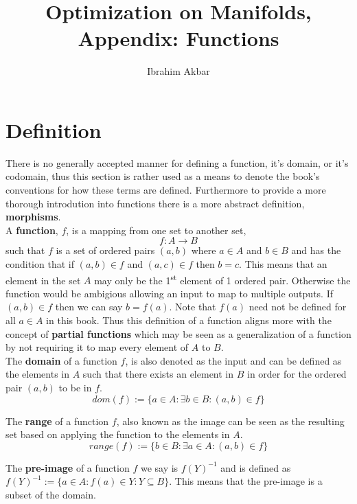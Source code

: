 \documentclass[a4paper]{article}
\begin{document}
\title{Optimization on Manifolds, Appendix: Functions}
\author{Ibrahim Akbar}
\maketitle


\section{Definition}

There is no generally accepted manner for defining a function, it's domain, or it's codomain, thus this section is rather used as a means to denote the book's conventions for how these terms are defined. Furthermore to provide a more thorough introdution into functions there is a more abstract definition, \textbf{morphisms}.\\

\noindent A \textbf{function}, $f$, is a mapping from one set to another set,
$$
f: A\rightarrow B
$$
such that $f$ is a set of ordered pairs $(a,b)$ where $a\in A$ and $b\in B$ and has the condition that if $(a,b)\in f$ and $(a,c)\in f$ then $b=c$. This means that an element in the set $A$ may only be the 1\textsuperscript{st} element of 1 ordered pair. Otherwise the function would be ambigious allowing an input to map to multiple outputs. If $(a,b)\in f$ then we can say $b = f(a)$. Note that $f(a)$ need not be defined for all $a\in A$ in this book. Thus this definition of a function aligns more with the concept of \textbf{partial functions} which may be seen as a generalization of a function by not requiring it to map every element of $A$ to $B$.\\

\noindent The \textbf{domain} of a function $f$, is also denoted as the input and can be defined as the elements in $A$ such that there exists an element in $B$ in order for the ordered pair $(a,b)$ to be in $f$.
$$
dom(f) := \{a\in A: \exists b\in B: (a,b)\in f\}
$$

\noindent The \textbf{range} of a function $f$, also known as the image can be seen as the resulting set based on applying the function to the elements in $A$.
$$
range(f) := \{b\in B:\exists a\in A:(a,b)\in f\}
$$

\noindent The \textbf{pre-image} of a function $f$ we say is $f(Y)^{-1}$ and is defined as $f(Y)^{-1} := \{a\in A:f(a)\in Y:Y\subseteq B\}$. This means that the pre-image is a subset of the domain.\\
\end{document}
